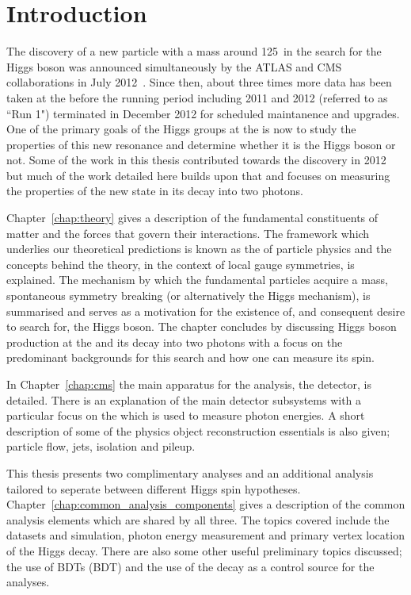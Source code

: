 \chapter{Introduction}
\label{chap:intro}

The discovery of a new particle with a mass around 125~\GeV in the search for the \SM Higgs boson was announced simultaneously by the ATLAS and CMS collaborations in July 2012~\cite{ATLASDiscovery,CMSDiscovery}. Since then, about three times more data has been taken at the \LHC before the running period including 2011 and 2012 (referred to as ``Run 1") terminated in December 2012 for scheduled maintanence and upgrades. One of the primary goals of the Higgs groups at the \LHC is now to study the properties of this new resonance and determine whether it is the \SM Higgs boson or not. Some of the work in this thesis contributed towards the discovery in 2012 but much of the work detailed here builds upon that and focuses on measuring the properties of the new state in its decay into two photons. 

Chapter~\ref{chap:theory} gives a description of the fundamental constituents of matter and the forces that govern their interactions. The framework which underlies our theoretical predictions is known as the \SM of particle physics and the concepts behind the theory, in the context of local gauge symmetries, is explained. The mechanism by which the fundamental particles acquire a mass, spontaneous symmetry breaking (or alternatively the Higgs mechanism), is summarised and serves as a motivation for the existence of, and consequent desire to search for, the Higgs boson. The chapter concludes by discussing Higgs boson production at the \LHC and its decay into two photons with a focus on the predominant backgrounds for this search and how one can measure its spin.

In Chapter~\ref{chap:cms} the main apparatus for the analysis, the \CMS detector, is detailed. There is an explanation of the main detector subsystems with a particular focus on the \ECAL which is used to measure photon energies. A short description of some of the physics object reconstruction essentials is also given; particle flow, jets, isolation and pileup.

This thesis presents two complimentary analyses and an additional analysis tailored to seperate between different Higgs spin hypotheses. Chapter~\ref{chap:common_analysis_components} gives a description of the common analysis elements which are shared by all three. The topics covered include the datasets and \MC simulation, photon energy measurement and primary vertex location of the Higgs decay. There are also some other useful preliminary topics discussed; the use of \aclp{BDT} (\acs{BDT}) and the use of the \Zee decay as a control source for the \Hgg analyses.

